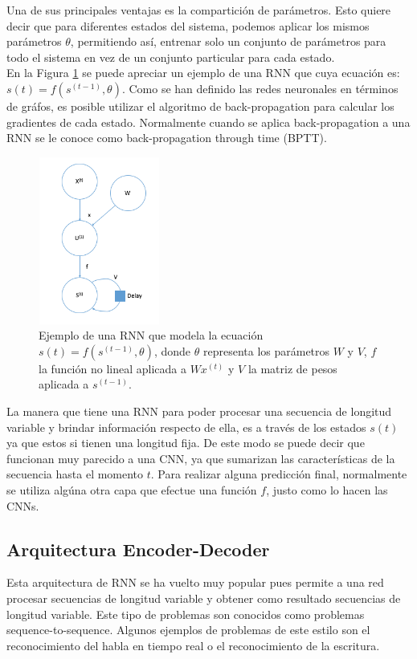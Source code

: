 Una de sus principales ventajas es la compartición de parámetros. Esto quiere decir que para diferentes estados del sistema, podemos aplicar los mismos parámetros $\theta$, permitiendo así, entrenar solo un conjunto de parámetros para todo el sistema en vez de un conjunto particular para cada estado. \\

En la Figura \ref{fig:rnn} se puede apreciar un ejemplo de una RNN que cuya ecuación es: $s(t) = f(s^{(t-1)}, \theta)$. Como se han definido las redes neuronales en términos de gráfos, es posible utilizar el algoritmo de back-propagation para calcular los gradientes de cada estado. Normalmente cuando se aplica back-propagation a una RNN se le conoce como back-propagation through time (BPTT). \\

\begin{figure}[H]
	\centering
	\includegraphics[width=4cm, height=5.5cm]{capitulo2/images/rnn}
	\caption{Ejemplo de una RNN que modela la ecuación $s(t) = f(s^{(t-1)}, \theta)$, donde $\theta$ representa los parámetros $W$ y $V$, $f$ la función no lineal aplicada a $Wx^{(t)}$ y $V$ la matriz de pesos aplicada a $s^{(t-1)}$.}
	\label{fig:rnn}
\end{figure}

La manera que tiene una RNN para poder procesar una secuencia de longitud variable y brindar información respecto de ella, es a través de los estados $s(t)$ ya que estos si tienen una longitud fija. De este modo se puede decir que funcionan muy parecido a una CNN, ya que sumarizan las características de la secuencia hasta el momento $t$. Para realizar alguna predicción final, normalmente se utiliza algúna otra capa que efectue una función $f$, justo como lo hacen las CNNs. \\
  
    \subsection{Arquitectura Encoder-Decoder}
    Esta arquitectura de RNN se ha vuelto muy popular pues permite a una red procesar secuencias de longitud variable y obtener como resultado secuencias de longitud variable. Este tipo de problemas son conocidos como problemas sequence-to-sequence. Algunos ejemplos de problemas de este estilo son el reconocimiento del habla en tiempo real o el reconocimiento de la escritura. \\
    
